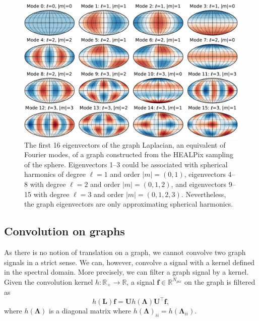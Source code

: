 \documentclass[final,twocolumn,3p,times,sort&compress]{elsarticle}
\renewcommand{\b}[1]{{\bm{#1}}}   %
\newcommand{\1}{\b{1}}              %
\newcommand{\0}{\b{0}}              %
\renewcommand{\L}{\b{L}}
\newcommand{\U}{\b{U}}
\newcommand{\f}{\b{f}}
\newcommand{\trans}{^\intercal}
\newcommand{\R}{\mathbb{R}}
\newcommand{\bLambda}{\b{\Lambda}}
\begin{document}
\begin{figure}
	\centering
	\includegraphics[width=\linewidth]{eigenvectors}
	\caption{The first 16 eigenvectors of the graph Laplacian, an equivalent of Fourier modes, of a graph constructed from the HEALPix sampling of the sphere.
    Eigenvectors 1--3 could be associated with spherical harmonics of degree $\ell=1$ and order $|m|=(0,1)$, eigenvectors 4--8 with degree $\ell=2$ and order $|m|=(0,1,2)$, and eigenvectors 9--15 with degree $\ell=3$ and order $|m|=(0,1,2,3)$.
    Nevertheless, the graph eigenvectors are only approximating spherical harmonics.}
	\label{fig:graph_harmonics}
\end{figure}

\subsection{Convolution on graphs}
\label{sec:graph_convolution}


As there is no notion of translation on a graph, we cannot convolve two graph signals in a strict sense.
We can, however, convolve a signal with a kernel defined in the spectral domain.
More precisely, we can filter a graph signal by a kernel.
Given the convolution kernel
$h: \R_+ \rightarrow \R$, a signal $\f \in \R^{N_{pix}}$ on the graph is filtered as
\begin{equation} \label{eqn:graph_convolution_fourier}
	h(\L) \f = \U h(\bLambda) \U\trans \f,
\end{equation}
where $h(\bLambda)$ is a diagonal matrix where $h(\bLambda)_{ii} = h(\bLambda_{ii})$.
\end{document}
